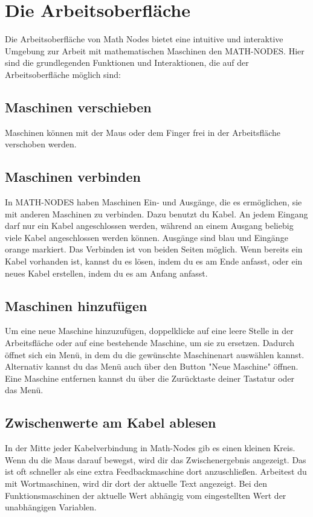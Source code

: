 \documentclass[12pt]{report}
\begin{document}
\section{Die Arbeitsoberfläche}
Die Arbeitsoberfläche von Math Nodes bietet eine intuitive und interaktive Umgebung zur Arbeit mit mathematischen Maschinen den MATH-NODES. Hier sind die grundlegenden Funktionen und Interaktionen, die auf der Arbeitsoberfläche möglich sind:
\subsection{Maschinen verschieben}
Maschinen können mit der Maus oder dem Finger frei in der Arbeitsfläche verschoben werden.
\subsection{Maschinen verbinden}
In MATH-NODES haben Maschinen Ein- und Ausgänge, die es ermöglichen, sie mit anderen Maschinen zu verbinden. Dazu benutzt du Kabel. An jedem Eingang darf nur ein Kabel angeschlossen werden, während an einem Ausgang beliebig viele Kabel angeschlossen werden können. Ausgänge sind blau und Eingänge orange markiert. Das Verbinden ist von beiden Seiten möglich. Wenn bereits ein Kabel vorhanden ist, kannst du es lösen, indem du es am Ende anfasst, oder ein neues Kabel erstellen, indem du es am Anfang anfasst.
\subsection{Maschinen hinzufügen}
Um eine neue Maschine hinzuzufügen, doppelklicke auf eine leere Stelle in der Arbeitsfläche oder auf eine bestehende Maschine, um sie zu ersetzen. Dadurch öffnet sich ein Menü, in dem du die gewünschte Maschinenart auswählen kannst. Alternativ kannst du das Menü auch über den Button "Neue Maschine" öffnen. Eine Maschine entfernen kannst du über die Zurücktaste deiner Tastatur oder das Menü.
\subsection{Zwischenwerte am Kabel ablesen}
In der Mitte jeder Kabelverbindung in Math-Nodes gib es einen kleinen Kreis. Wenn du die Maus darauf bewegst, wird dir das Zwischenergebnis angezeigt. Das ist oft schneller als eine extra Feedbackmaschine dort anzuschließen. Arbeitest du mit Wortmaschinen, wird dir dort der aktuelle Text angezeigt. Bei den Funktionsmaschinen der aktuelle Wert abhängig vom eingestellten Wert der unabhängigen Variablen. 
\end{document}

